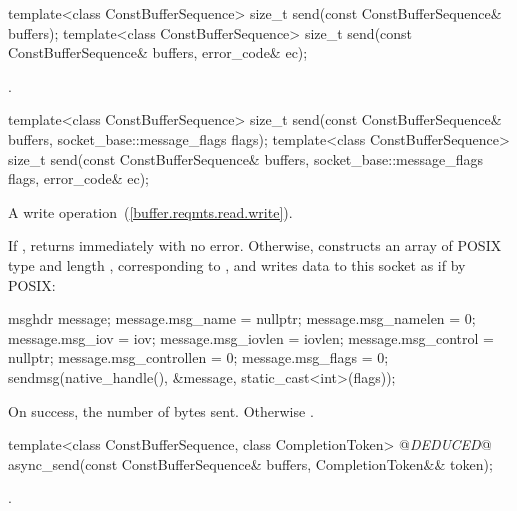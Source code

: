 \begin{itemdecl}
template<class ConstBufferSequence>
  size_t send(const ConstBufferSequence& buffers);
template<class ConstBufferSequence>
  size_t send(const ConstBufferSequence& buffers, error_code& ec);
\end{itemdecl}

\begin{itemdescr}
\pnum
\returns {}.
\end{itemdescr}

\begin{itemdecl}
template<class ConstBufferSequence>
  size_t send(const ConstBufferSequence& buffers,
              socket_base::message_flags flags);
template<class ConstBufferSequence>
  size_t send(const ConstBufferSequence& buffers,
              socket_base::message_flags flags, error_code& ec);
\end{itemdecl}

\begin{itemdescr}
\pnum
A write operation~(\ref{buffer.reqmts.read.write}).

\pnum
\effects If , returns immediately with no error. Otherwise, constructs an array  of POSIX type  and length , corresponding to , and writes data to this socket as if by POSIX: 
\begin{codeblock}
msghdr message;
message.msg_name = nullptr;
message.msg_namelen = 0;
message.msg_iov = iov;
message.msg_iovlen = iovlen;
message.msg_control = nullptr;
message.msg_controllen = 0;
message.msg_flags = 0;
sendmsg(native_handle(), &message, static_cast<int>(flags));
\end{codeblock}


\pnum
\returns On success, the number of bytes sent. Otherwise .
\end{itemdescr}

\begin{itemdecl}
template<class ConstBufferSequence, class CompletionToken>
  @\textit{DEDUCED}@ async_send(const ConstBufferSequence& buffers, CompletionToken&& token);
\end{itemdecl}

\begin{itemdescr}
\pnum
\returns {}.
\end{itemdescr}

